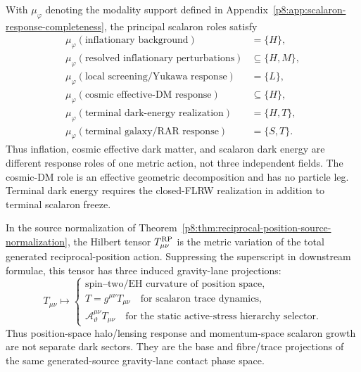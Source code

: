 \documentclass[12pt,a4paper]{article}
\begin{document}
\begin{corollary}
\label{p8:cor:headline-scalaron-role-map}
With $\mu_\varphi$ denoting the modality support defined in
Appendix~\ref{p8:app:scalaron-response-completeness}, the principal scalaron roles
satisfy
\begin{equation}
\label{p8:eq:headline-scalaron-modality-map}
\begin{aligned}
\mu_\varphi(\text{inflationary background})&=\{H\},\\
\mu_\varphi(\text{resolved inflationary perturbations})&\subseteq\{H,M\},\\
\mu_\varphi(\text{local screening/Yukawa response})&=\{L\},\\
\mu_\varphi(\text{cosmic effective-DM response})&\subseteq\{H\},\\
\mu_\varphi(\text{terminal dark-energy realization})&=\{H,T\},\\
\mu_\varphi(\text{terminal galaxy/RAR response})&=\{S,T\}.
\end{aligned}
\end{equation}
Thus inflation, cosmic effective dark matter, and scalaron dark energy are
different response roles of one metric action, not three independent fields.
The cosmic-DM role is an effective geometric decomposition and has no
particle leg.  Terminal dark energy requires the closed-FLRW realization in
addition to terminal scalaron freeze.
\end{corollary}

\begin{corollary}
\label{p8:cor:stress-energy-phase-space-projections}
In the source normalization of Theorem~\ref{p8:thm:reciprocal-position-source-normalization}, the Hilbert tensor \(T^{\rm RP}_{\mu\nu}\) is the metric variation of the total generated reciprocal-position action.  Suppressing the superscript in downstream formulae, this tensor has three induced gravity-lane projections:
\begin{equation}
\label{p8:eq:stress-projection-triplet}
T_{\mu\nu}
\longmapsto
\begin{cases}
\text{spin--two/EH curvature of position space},\\[2mm]
T=g^{\mu\nu}T_{\mu\nu}\quad \text{for scalaron trace dynamics},\\[2mm]
\mathcal A_\vartheta^{\mu\nu}T_{\mu\nu}\quad \text{for the static active-stress hierarchy selector}.
\end{cases}
\end{equation}
Thus position-space halo/lensing response and momentum-space scalaron growth are not separate dark sectors.  They are the base and fibre/trace projections of the same generated-source gravity-lane contact phase space.
\end{corollary}
\end{document}

